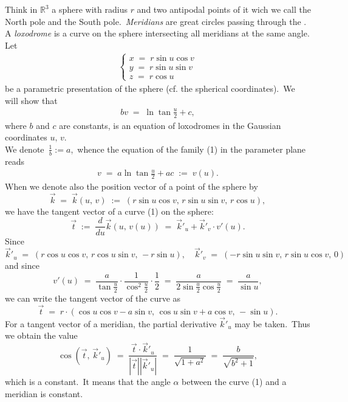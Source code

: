 \documentclass[12pt]{article}
\theoremstyle{definition}
\begin{document}

Think in $\mathbb{R}^3$ a sphere with radius $r$ and two antipodal points of it wich we call the North pole and the South pole.\, \emph{Meridians} are great circles passing through the .\, A \emph{loxodrome} is a curve on the sphere intersecting all meridians at the same angle.\\


Let 
\begin{align*}
\begin{cases}
x \;=\; r\sin{u}\cos{v}\\
y \;=\; r\sin{u}\sin{v}\\
z \;=\; r\cos{u}
\end{cases}
\end{align*}
be a parametric presentation of the sphere (cf. the spherical coordinates).\, We will show that
\begin{align}
bv \;=\; \ln\tan\frac{u}{2}+c,
\end{align}
where $b$ and $c$ are constants, is an equation of loxodromes in the Gaussian coordinates $u,\,v$.\\

We denote\, $\displaystyle\frac{1}{b} := a$,\, whence the equation of the family (1) in the parameter plane reads
\begin{align}
v \;=\; a\ln\tan\frac{u}{2}+ac \;:=\; v(u).
\end{align}
When we denote also the position vector of a point of the sphere by
$$\vec{k} \;=\; \vec{k}(u,\,v) \;:=\; (r\sin{u}\cos{v},\,r\sin{u}\sin{v},\,r\cos{u}),$$
we have the tangent vector of a curve (1) on the sphere:
$$\vec{t} \;:=\; \frac{d}{du}\vec{k}(u,\,v(u)) \;=\; \vec{k}'_u+\vec{k}'_v\!\cdot\!v'(u).$$
Since
$$\vec{k}'_u \;=\; (r\cos{u}\cos{v},\,r\cos{u}\sin{v},\,-r\sin{u}), \quad 
\vec{k}'_v \;=\; (-r\sin{u}\sin{v},\,r\sin{u}\cos{v},\,0)$$
and since
$$v'(u) \;=\; \frac{a}{\tan{\frac{u}{2}}}\cdot\frac{1}{\cos^2\frac{u}{2}}\cdot\frac{1}{2} 
\;=\; \frac{a}{2\sin\frac{u}{2}\cos\frac{u}{2}} \;=\; \frac{a}{\sin{u}},$$
we can write the tangent vector of the curve as
$$\vec{t} \;=\; r\cdot(\cos{u}\cos{v}-a\sin{v},\,\cos{u}\sin{v}+a\cos{v},\,-\sin{u}).$$
For a tangent vector of a meridian, the partial derivative $\vec{k}'_u$ may be taken.\, 
Thus we obtain the value
$$\cos(\vec{t},\,\vec{k}'_u) \;=\; \frac{\vec{t}\cdot\vec{k}'_u}{\left|\vec{t}\right||\vec{k}'_u|} 
\;=\; \frac{1}{\sqrt{1\!+\!a^2}} \;=\; \frac{b}{\sqrt{b^2\!+\!1}},$$
which is a constant.\, It means that the angle $\alpha$ between the curve (1) and a meridian is constant.\\
\end{document}
